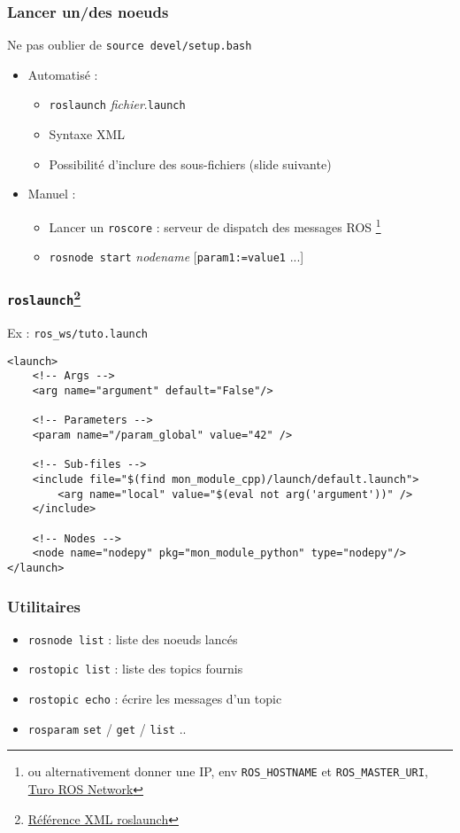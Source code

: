 \documentclass{beamer}
\begin{document}
\begin{frame}
\frametitle{Lancer un/des noeuds}
Ne pas oublier de \texttt{source devel/setup.bash}
\begin{itemize}
    \item Automatisé : \begin{itemize}
        \item \texttt{roslaunch} \textit{fichier}.\texttt{launch}
        \item Syntaxe XML
        \item Possibilité d'inclure des sous-fichiers (slide suivante)
    \end{itemize}
    \item Manuel : \begin{itemize}
        \item Lancer un \texttt{roscore} : serveur de dispatch des messages ROS \footnote{ou
        alternativement donner une IP, env \texttt{ROS\_HOSTNAME} et \texttt{ROS\_MASTER\_URI},
        \href{http://wiki.ros.org/ROS/NetworkSetup}{Turo ROS Network}}
        \item \texttt{rosnode start} \textit{nodename} [\texttt{param1:=value1} ...]
    \end{itemize}
\end{itemize}
\end{frame}

\begin{frame}[fragile]
\frametitle{\texttt{roslaunch}\footnote{\href{http://wiki.ros.org/roslaunch/XML
}{Référence XML roslaunch}}}
Ex : \texttt{ros\_ws/tuto.launch}

\begin{verbatim}
<launch>
    <!-- Args -->
    <arg name="argument" default="False"/>

    <!-- Parameters -->
    <param name="/param_global" value="42" />

    <!-- Sub-files -->
    <include file="$(find mon_module_cpp)/launch/default.launch">
        <arg name="local" value="$(eval not arg('argument'))" />
    </include>

    <!-- Nodes -->
    <node name="nodepy" pkg="mon_module_python" type="nodepy"/>
</launch>
\end{verbatim}
\end{frame}


\begin{frame}
\frametitle{Utilitaires}
\begin{itemize}
    \item \texttt{rosnode list} : liste des noeuds lancés
    \item \texttt{rostopic list} : liste des topics fournis
    \item \texttt{rostopic echo} : écrire les messages d'un topic
    \item \texttt{rosparam} \texttt{set} / \texttt{get} / \texttt{list} ..
\end{itemize}
\end{frame}
\end{document}
